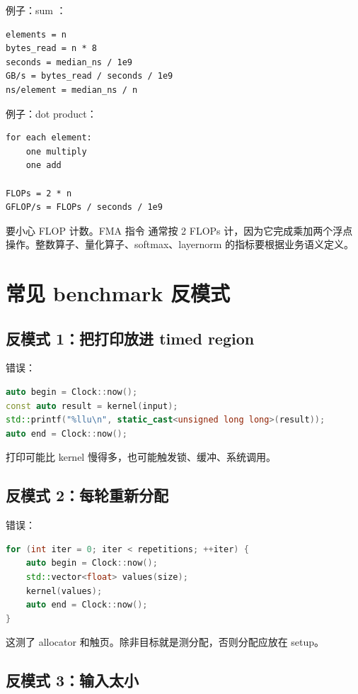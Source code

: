 例子：sum ：

\begin{lstlisting}
elements = n
bytes_read = n * 8
seconds = median_ns / 1e9
GB/s = bytes_read / seconds / 1e9
ns/element = median_ns / n
\end{lstlisting}

例子：dot product：

\begin{lstlisting}
for each element:
    one multiply
    one add

FLOPs = 2 * n
GFLOP/s = FLOPs / seconds / 1e9
\end{lstlisting}

要小心 FLOP 计数。FMA 指令  通常按 2 FLOPs 计，因为它完成乘加两个浮点操作。整数算子、量化算子、softmax、layernorm 的指标要根据业务语义定义。

\section{常见 benchmark 反模式}

\subsection{反模式 1：把打印放进 timed region}

错误：

\begin{lstlisting}[language=C++]
auto begin = Clock::now();
const auto result = kernel(input);
std::printf("%llu\n", static_cast<unsigned long long>(result));
auto end = Clock::now();
\end{lstlisting}

打印可能比 kernel 慢得多，也可能触发锁、缓冲、系统调用。

\subsection{反模式 2：每轮重新分配}

错误：

\begin{lstlisting}[language=C++]
for (int iter = 0; iter < repetitions; ++iter) {
    auto begin = Clock::now();
    std::vector<float> values(size);
    kernel(values);
    auto end = Clock::now();
}
\end{lstlisting}

这测了 allocator 和触页。除非目标就是测分配，否则分配应放在 setup。

\subsection{反模式 3：输入太小}

